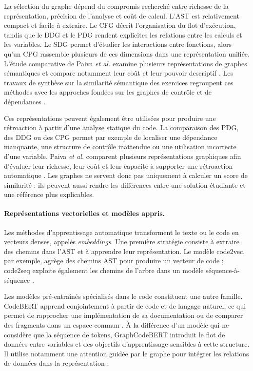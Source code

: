 \documentclass[12pt,a4paper,oneside]{report}
\begin{document}
La sélection du graphe dépend du compromis recherché entre richesse de la
représentation, précision de l'analyse et coût de calcul. L'AST est
relativement compact et facile à extraire. Le CFG décrit l'organisation du
flot d'exécution, tandis que le DDG et le PDG rendent explicites les
relations entre les calculs et les variables. Le SDG permet d'étudier les
interactions entre fonctions, alors qu'un CPG rassemble plusieurs de ces
dimensions dans une représentation unifiée. L'étude comparative de Paiva
\emph{et al.} examine plusieurs représentations de graphes sémantiques et
compare notamment leur coût et leur pouvoir descriptif
\cite{paiva_comparing_2024}. Les travaux de synthèse sur la similarité
sémantique des exercices regroupent ces méthodes avec les approches fondées
sur les graphes de contrôle et de dépendances
\cite{reddy_graph-based_2025}.

Ces représentations peuvent également être utilisées pour produire une
rétroaction à partir d'une analyse statique du code. La comparaison des PDG,
des DDG ou des CPG permet par exemple de localiser une dépendance manquante,
une structure de contrôle inattendue ou une utilisation incorrecte d'une
variable. Paiva \emph{et al.} comparent plusieurs représentations
graphiques afin d'évaluer leur richesse, leur coût et leur capacité à
supporter une rétroaction automatique \cite{paiva_comparing_2024}. Les
graphes ne servent donc pas uniquement à calculer un score de similarité :
ils peuvent aussi rendre les différences entre une solution étudiante et une
référence plus explicables.

\paragraph{Représentations vectorielles et modèles appris.}

Les méthodes d'apprentissage automatique transforment le texte ou le code en
vecteurs denses, appelés \emph{embeddings}. Une première stratégie consiste
à extraire des chemins dans l'AST et à apprendre leur représentation. Le
modèle code2vec, par exemple, agrège des chemins AST pour produire un vecteur
de code \cite{alon_2019} ; code2seq exploite également les chemins de l'arbre
dans un modèle séquence-à-séquence \cite{alon_code2seq_2019}.

Les modèles pré-entraînés spécialisés dans le code constituent une autre
famille. CodeBERT apprend conjointement à partir de code et de langage
naturel, ce qui permet de rapprocher une implémentation de sa documentation
ou de comparer des fragments dans un espace commun \cite{feng_2020}. À la
différence d'un modèle qui ne considère que la séquence de tokens,
GraphCodeBERT introduit le flot de données entre variables et des objectifs
d'apprentissage sensibles à cette structure. Il utilise notamment une
attention guidée par le graphe pour intégrer les relations de données dans
la représentation \cite{guo_2021}.
\end{document}
